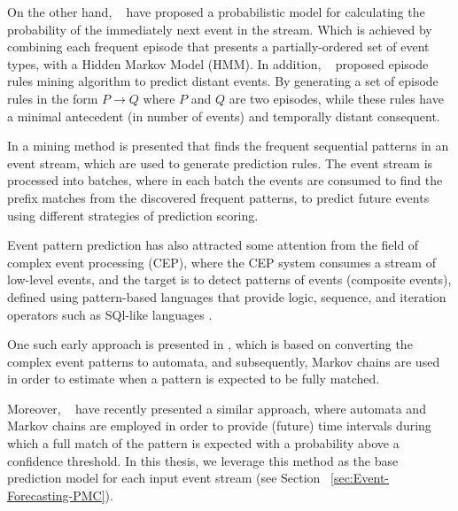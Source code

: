 \par On the other hand, ~\citet{laxman_stream_2008} have proposed a probabilistic model for calculating the probability of the immediately next event in the stream. Which is achieved by combining each frequent episode \cite{mannila1997discovery} that presents a partially-ordered set of event types, with a Hidden Markov Model (HMM). In addition, ~\citet{fahed_efficient_2014} proposed episode rules mining algorithm to predict distant events. By generating a set of episode rules in the form \(P \rightarrow Q \) where $P$ and $Q$ are two episodes, while these rules have a minimal antecedent (in number of events) and temporally distant consequent.

\par In \cite{zhou_pattern_2015} a mining method is presented that finds the frequent sequential patterns in an event stream, which are used to generate prediction rules. The event stream is processed into batches, where in each batch the events are consumed to find the prefix matches from the discovered frequent patterns, to predict future events using different strategies of prediction scoring.

\par Event pattern prediction has also attracted some attention from the field of complex event processing (CEP), where the CEP system consumes a stream of low-level events, and the target is to detect patterns of events (composite events), defined using pattern-based languages that provide logic, sequence, and iteration operators such as SQl-like languages \cite{Cugola:2012:PFI:2187671.2187677}. 
\par One such early approach is presented in \cite{muthusamy_predictive_2010}, which is based on converting the complex event patterns to automata, and subsequently, Markov chains are used in order to estimate when a pattern is expected to be fully matched. 
\par Moreover, ~\citet{alevizos2017event} have recently presented a similar approach, where automata and Markov chains are employed in order to provide (future) time intervals during which a full match of the pattern is expected with a probability above a confidence threshold. In this thesis, we leverage this method as the base prediction model for each input event stream (see Section ~\ref{sec:Event-Forecasting-PMC}). 